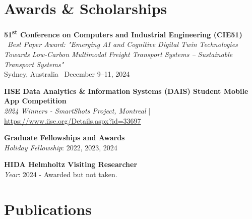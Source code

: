 \documentclass[10pt, letterpaper]{article}
\begin{document}
    
    


        \section*{Awards \& Scholarships}


        \noindent \textbf{51\textsuperscript{st} Conference on Computers and Industrial Engineering (CIE51)} \ \textit{Best Paper Award: "Emerging AI and Cognitive Digital Twin Technologies Towards Low-Carbon Multimodal Freight Transport Systems – Sustainable Transport Systems"} \\ Sydney, Australia \  December 9–11, 2024 \
        \vspace{0.5em}


     
        \noindent \textbf{IISE Data Analytics \& Information Systems (DAIS) Student Mobile App Competition} \\
        \textit{2024 Winners - SmartShots Project, Montreal} | \url{https://www.iise.org/Details.aspx?id=33697}\\
        
        
     
        
        \vspace{0.5em} %
        
        \noindent \textbf{Graduate Fellowships and Awards} \\
        \textit{Holiday Fellowship}: 2022, 2023, 2024 \\
        
        \vspace{0.5em} %
        
        \noindent \textbf{HIDA Helmholtz Visiting Researcher} \\
        \textit{Year}: 2024 - Awarded but not taken.

        



\section*{Publications}
\end{document}
